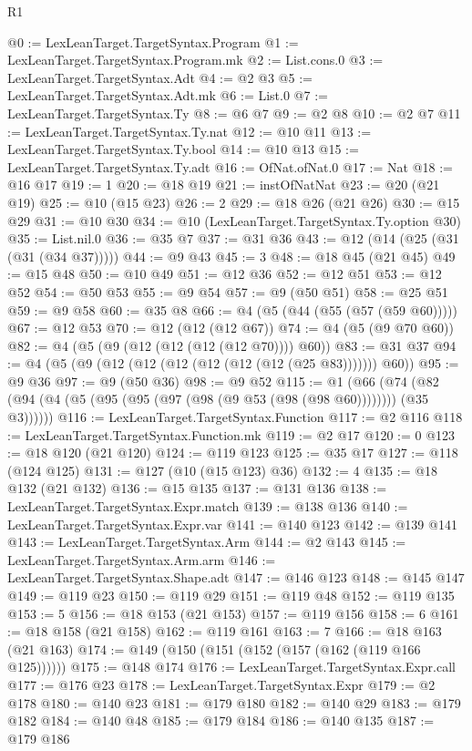 \begin{lexlean}{R1}
\begin{coremodule}
@0 := LexLeanTarget.TargetSyntax.Program
@1 := LexLeanTarget.TargetSyntax.Program.mk
@2 := List.cons.{0}
@3 := LexLeanTarget.TargetSyntax.Adt
@4 := @2 @3
@5 := LexLeanTarget.TargetSyntax.Adt.mk
@6 := List.{0}
@7 := LexLeanTarget.TargetSyntax.Ty
@8 := @6 @7
@9 := @2 @8
@10 := @2 @7
@11 := LexLeanTarget.TargetSyntax.Ty.nat
@12 := @10 @11
@13 := LexLeanTarget.TargetSyntax.Ty.bool
@14 := @10 @13
@15 := LexLeanTarget.TargetSyntax.Ty.adt
@16 := OfNat.ofNat.{0}
@17 := Nat
@18 := @16 @17
@19 := 1
@20 := @18 @19
@21 := instOfNatNat
@23 := @20 (@21 @19)
@25 := @10 (@15 @23)
@26 := 2
@29 := @18 @26 (@21 @26)
@30 := @15 @29
@31 := @10 @30
@34 := @10 (LexLeanTarget.TargetSyntax.Ty.option @30)
@35 := List.nil.{0}
@36 := @35 @7
@37 := @31 @36
@43 := @12 (@14 (@25 (@31 (@31 (@34 @37)))))
@44 := @9 @43
@45 := 3
@48 := @18 @45 (@21 @45)
@49 := @15 @48
@50 := @10 @49
@51 := @12 @36
@52 := @12 @51
@53 := @12 @52
@54 := @50 @53
@55 := @9 @54
@57 := @9 (@50 @51)
@58 := @25 @51
@59 := @9 @58
@60 := @35 @8
@66 := @4 (@5 (@44 (@55 (@57 (@59 @60)))))
@67 := @12 @53
@70 := @12 (@12 (@12 @67))
@74 := @4 (@5 (@9 @70 @60))
@82 := @4 (@5 (@9 (@12 (@12 (@12 (@12 @70)))) @60))
@83 := @31 @37
@94 := @4 (@5 (@9 (@12 (@12 (@12 (@12 (@12 (@12 (@25 @83))))))) @60))
@95 := @9 @36
@97 := @9 (@50 @36)
@98 := @9 @52
@115 := @1
    (@66 (@74 (@82 (@94 (@4 (@5 (@95 (@95 (@97 (@98 (@9 @53 (@98 (@98 @60)))))))) (@35 @3))))))
@116 := LexLeanTarget.TargetSyntax.Function
@117 := @2 @116
@118 := LexLeanTarget.TargetSyntax.Function.mk
@119 := @2 @17
@120 := 0
@123 := @18 @120 (@21 @120)
@124 := @119 @123
@125 := @35 @17
@127 := @118 (@124 @125)
@131 := @127 (@10 (@15 @123) @36)
@132 := 4
@135 := @18 @132 (@21 @132)
@136 := @15 @135
@137 := @131 @136
@138 := LexLeanTarget.TargetSyntax.Expr.match
@139 := @138 @136
@140 := LexLeanTarget.TargetSyntax.Expr.var
@141 := @140 @123
@142 := @139 @141
@143 := LexLeanTarget.TargetSyntax.Arm
@144 := @2 @143
@145 := LexLeanTarget.TargetSyntax.Arm.arm
@146 := LexLeanTarget.TargetSyntax.Shape.adt
@147 := @146 @123
@148 := @145 @147
@149 := @119 @23
@150 := @119 @29
@151 := @119 @48
@152 := @119 @135
@153 := 5
@156 := @18 @153 (@21 @153)
@157 := @119 @156
@158 := 6
@161 := @18 @158 (@21 @158)
@162 := @119 @161
@163 := 7
@166 := @18 @163 (@21 @163)
@174 := @149 (@150 (@151 (@152 (@157 (@162 (@119 @166 @125))))))
@175 := @148 @174
@176 := LexLeanTarget.TargetSyntax.Expr.call
@177 := @176 @23
@178 := LexLeanTarget.TargetSyntax.Expr
@179 := @2 @178
@180 := @140 @23
@181 := @179 @180
@182 := @140 @29
@183 := @179 @182
@184 := @140 @48
@185 := @179 @184
@186 := @140 @135
@187 := @179 @186

\end{coremodule}
\end{lexlean}
